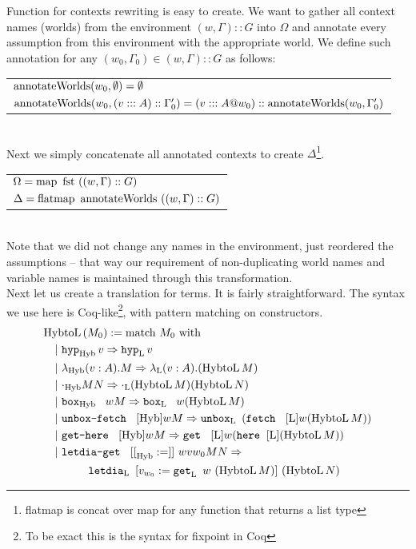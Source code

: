 Function \funHybtoLe{} for contexts rewriting is easy to create. We want to gather all context names (worlds) from the environment $(w, \Gamma) :: G$ into $\Omega$ and annotate every assumption from this environment with the appropriate world. We define such annotation for any $(w_0, \Gamma_0) \in (w, \Gamma)::G$ as follows:\\

\begin{tabular} { l }
$\mbox{$\operatorname{annotateWorlds}({w_0}, {\mbox{$\emptyset$}})$}= \mbox{$\emptyset$}$ \\
$\mbox{$\operatorname{annotateWorlds}({w_0}, {(v:::A)::\Gamma'_0})$}= (v:::A @ w_0) :: \mbox{$\operatorname{annotateWorlds}({w_0}, {\Gamma'_0})$}$
\end{tabular}\\

Next we simply concatenate all annotated contexts to create $\Delta$\footnote{flatmap is concat over map for any function that returns a list type}.\\

\begin{tabular} { l }
$\Omega = \mbox{$\operatorname{map}\ {\mbox{$\text{fst}$}{}} \ {((w, \Gamma)::G)}$}$\\
$\Delta = \mbox{$\operatorname{flatmap}\ {\text{annotateWorlds}}\ {((w, \Gamma)::G)}$}$
\end{tabular}\\

Note that we did not change any names in the environment, just reordered the assumptions -- that way our requirement of non-duplicating world names and variable names is maintained through this transformation.\\

Next let us create a translation for terms. It is fairly straightforward. The syntax we use here is Coq-like\footnote{To be exact this is the syntax for fixpoint in Coq}, with pattern matching on constructors.
\begin{align*}
&\funHybtoL{M_0}:=\match{M_0}\\
&~~~|~ \hyp[\tHyb{}]{v} => \hyp[\tL{}]{v}\\
&~~~|~ \lam[\tHyb{}]{v}{A}{M} =>  \lam[\tL]{v}{A}(\funHybtoLe{M}) \\
&~~~|~ \appl[\tHyb] M N => \appl[\tL] {(\funHybtoLe{M})} {(\funHybtoLe{N})}\\
&~~~|~ \bbox[\tHyb] w M => \bbox[\tL] w (\funHybtoLe{M}) \\
&~~~|~ \unboxfetch [\tHyb] w M => \unbox[\tL] (\fetch [\tL]w (\funHybtoLe{M})) \\
&~~~|~ \gethere [\tHyb] w M =>  \get [\tL] w (\here [\tL] (\funHybtoLe{M}))\\
&~~~|~ \letdiaget [\tHyb] w v {w_0} M N =>\\
&~~~~~~~~~~~~\letdia [\tL] {v}{w_0} {\get [\tL] w (\funHybtoLe{M})} {(\funHybtoLe{N})} \\
\end{align*}

